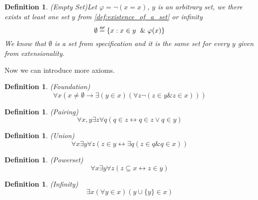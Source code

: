 \documentclass[12pt,a4paper]{article}
\newtheorem{definition}[theorem]{Definition}
\renewcommand{\iff}{\leftrightarrow}
\newcommand{\then}{\rightarrow}
\newcommand{\et}{\mathrel{\&}}
\newcommand\defeq{\mathrel{\overset{\makebox[0pt]{\mbox{\normalfont\tiny\sffamily def}}}{=}}}
\begin{document}
\begin{definition}{(Empty Set)}\label{def:emptyset}
Let $\varphi = \neg(x = x)$, $y$ is an arbitrary set, we there exists at least one set $y$ from \ref{def:existence_of_a_set} or \emph{infinity}
\begin{equation}
\emptyset \defeq \{x : x \in y\ \et \varphi(x)\}
\end{equation}
We know that $\emptyset$ is a set from \emph{specification} and it is the same set for every $y$ given from \emph{extensionality}.
\end{definition}

Now we can introduce more axioms.
\begin{definition}{(Foundation)}\label{def:foundation}
\begin{equation}
\forall x (x \neq \emptyset \then \exists (y \in x) (\forall z \neg (z \in y \et z \in x)))
\end{equation}
\end{definition}

\begin{definition}{(Pairing)}\label{def:pairing}
\begin{equation}
\forall x, y \exists z \forall q (q \in z \iff q \in z \lor q \in y)
\end{equation}
\end{definition}

\begin{definition}{(Union)}\label{def:union}
\begin{equation}
\forall x \exists y \forall z (z \in y \iff \exists q( z \in q \et q \in x))
\end{equation}
\end{definition}

\begin{definition}{(Powerset)}\label{def:powerset}
\begin{equation}
\forall x \exists y \forall z (z \subseteq x \iff z \in y)
\end{equation}
\end{definition}

\begin{definition}{(Infinity)}\label{def:infinity}
\begin{equation}
\exists x (\forall y \in x)(y\cup\{y\} \in x)
\end{equation}
\end{definition}
\end{document}
